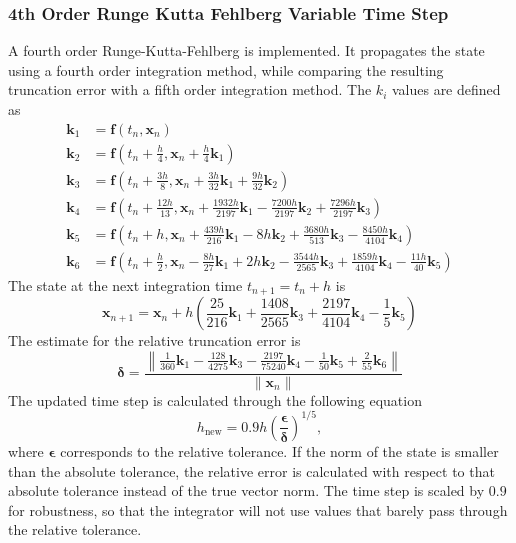 \subsubsection{4th Order Runge Kutta Fehlberg Variable Time Step}
A fourth order Runge-Kutta-Fehlberg is implemented. It propagates the state using a fourth order integration method, while comparing the resulting truncation error with a fifth order integration method. The $k_i$ values are defined as
\begin{align}
	\bm k_1 &= \bm f\left(t_{n}, \bm x_{n}\right) \label{eq:k1_RKF45}\\
	\bm k_2 &= \bm f\left(t_{n} + \frac{h}{4}, \bm x_{n} + \frac{h}{4} \bm k_1\right) \\
	\bm k_3 &= \bm f\left(t_{n} + \frac{3h}{8}, \bm x_{n} + \frac{3h}{32} \bm k_1 + \frac{9h}{32} \bm k_2\right) \\
	\bm k_4 &= \bm f\left(t_{n} + \frac{12h}{13}, \bm x_{n} + \frac{1932h}{2197} \bm k_1 - \frac{7200h}{2197} \bm k_2 + \frac{7296h}{2197} \bm k_3\right) \\
	\bm k_5 &= \bm f\left(t_{n} + h, \bm x_{n} + \frac{439h}{216} \bm k_1 - 8h \bm k_2 + \frac{3680h}{513} \bm k_3 - \frac{8450h}{4104} \bm k_4\right) \\
	\bm k_6 &= \bm f\left(t_{n} + \frac{h}{2}, \bm x_{n} - \frac{8h}{27} \bm k_1 + 2h \bm k_2 - \frac{3544h}{2565} \bm k_3 + \frac{1859h}{4104} \bm k_4 - \frac{11h}{40} \bm k_5\right) \label{eq:k6_RKF45}
\end{align}
The state at the next integration time $t_{n+1} = t_{n} + h$ is
\begin{equation}
	\bm x_{n+1} = \bm x_{n} + h \left(
		\frac{25}{216} \bm k_{1} + \frac{1408}{2565} \bm k_{3} + \frac{2197}{4104} \bm k_{4} - \frac{1}{5} \bm k_{5} \label{eq:PropagateState_RKF45}
	\right)
\end{equation}
The estimate for the relative truncation error is
\begin{equation}
	\bm \delta = \frac{\left\|
		\frac{1}{360} \bm k_{1} - \frac{128}{4275} \bm k_{3} - \frac{2197}{75240} \bm k_{4} - \frac{1}{50} \bm k_{5} + \frac{2}{55} \bm k_{6} \label{eq:Error_RKF45}
	\right\|}{\|\bm x_n\|}
\end{equation}
The updated time step is calculated through the following equation
\begin{equation}
	h_{\text{new}}=0.9h\left(\frac{\bm \epsilon}{\bm \delta}\right)^{1/5}, \label{eq:h_RKF45}
\end{equation}
where $\bm \epsilon$ corresponds to the relative tolerance. If the norm of the state is smaller than the absolute tolerance, the relative error is calculated with respect to that absolute tolerance instead of the true vector norm. The time step is scaled by $0.9$ for robustness, so that the integrator will not use values that barely pass through the relative tolerance.\\
